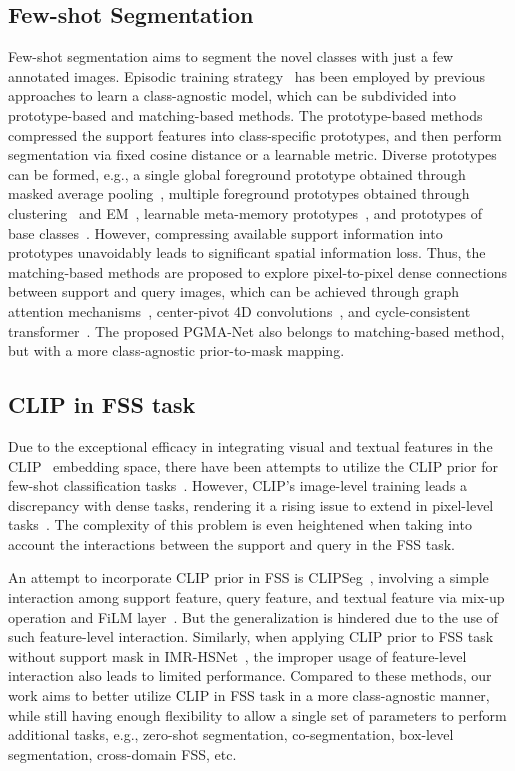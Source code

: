 \documentclass[lettersize,journal]{IEEEtran}
\begin{document}
\subsection{Few-shot Segmentation}
Few-shot segmentation aims to segment the novel classes with just a few annotated images. Episodic training strategy~\cite{vinyals2016matching} has been employed by previous approaches to learn a class-agnostic model, which  can be subdivided into prototype-based and matching-based methods. The prototype-based methods compressed the support features into class-specific prototypes, and then perform segmentation via fixed cosine distance or a learnable metric. Diverse prototypes can be formed, e.g., a single global foreground prototype obtained through masked average pooling~\cite{snell2017prototypical,wang2019panet,10109193}, multiple foreground prototypes obtained through clustering~\cite{li2021adaptive} and EM~\cite{yang2020prototype}, learnable meta-memory prototypes~\cite{wu2021learning}, and prototypes of base classes~\cite{cheng2023hpa}. However, compressing available support information into prototypes unavoidably leads to significant spatial information loss. Thus, the matching-based methods are proposed to explore pixel-to-pixel dense connections between support and query images, which can be achieved through graph attention mechanisms~\cite{zhang2019pyramid}, center-pivot 4D convolutions~\cite{min2021hypercorrelation}, and cycle-consistent transformer~\cite{zhang2021few}. The proposed PGMA-Net also belongs to matching-based method, but with a more class-agnostic prior-to-mask mapping.

\subsection{CLIP in FSS task}
Due to the exceptional efficacy in integrating visual and textual features in the CLIP~\cite{radford2021learning} embedding space, there have been attempts to utilize the CLIP prior for few-shot classification tasks~\cite{zhang2022tip,hu2022pushing}. However, CLIP's image-level training leads a discrepancy with dense tasks, rendering it a rising issue to extend in pixel-level tasks~\cite{li2022languagedriven,liu2023delving}. The complexity of this problem is even heightened when taking into account the interactions between the support and query in the FSS task. 

An attempt to incorporate CLIP prior in FSS is CLIPSeg~\cite{luddecke2022image}, involving a simple interaction among support feature, query feature, and textual feature via mix-up operation and FiLM layer~\cite{dumoulin2018feature}. But the generalization is hindered due to the use of such feature-level interaction. Similarly, when applying CLIP prior to FSS task without support mask in IMR-HSNet~\cite{wang2023iterative}, the improper usage of feature-level interaction also leads to limited performance. Compared to these methods, our work aims to better utilize CLIP in FSS task in a more class-agnostic manner, while still having enough flexibility to allow a single set of parameters to perform additional tasks, e.g., zero-shot segmentation, co-segmentation, box-level segmentation, cross-domain FSS, etc. 
\end{document}
